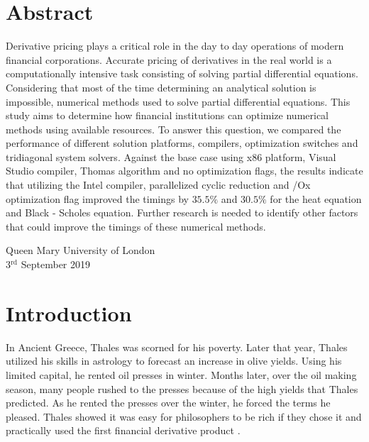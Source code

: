 \documentclass[12pt, oneside]{book}
\theoremstyle{plain}
\theoremstyle{definition}
\begin{document}
\chapter*{Abstract}
\begin{center}
\small 
Derivative pricing plays a critical role in the day to day operations of modern financial corporations. Accurate pricing of derivatives in the real world is a computationally intensive task consisting of solving partial differential equations. Considering that most of the time determining an analytical solution is impossible, numerical methods used to solve partial differential equations. This study aims to determine how financial institutions can optimize numerical methods using available resources. To answer this question, we compared the performance of different solution platforms, compilers, optimization switches and tridiagonal system solvers. Against the base case using x86 platform, Visual Studio compiler, Thomas algorithm and no optimization flags, the results indicate that utilizing the Intel compiler, parallelized cyclic reduction and /Ox optimization flag improved the timings by $35.5 \%$ and $30.5 \%$ for the heat equation and Black - Scholes equation. Further research is needed to identify other factors that could improve the timings of these numerical methods.

\end{center}       


\begin{flushright}
Queen Mary University of London\\
3${}^{\text{rd}}$ September 2019
\end{flushright}

\tableofcontents

\chapter{Introduction}
In Ancient Greece, Thales was scorned for his poverty. Later that year, Thales utilized his skills in astrology to forecast an increase in olive yields. Using his limited capital, he rented oil presses in winter. Months later, over the oil making season, many people rushed to the presses because of the high yields that Thales predicted. As he rented the presses over the winter, he forced the terms he pleased. Thales showed it was easy for philosophers to be rich if they chose it and practically used the first  financial derivative product \cite{thalesians}. 
\end{document}
